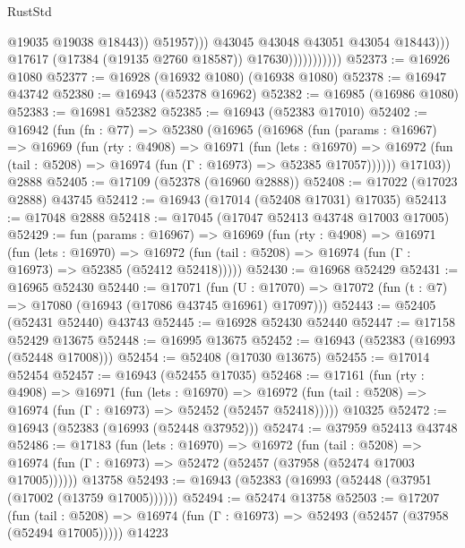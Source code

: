 \begin{lexlean}{RustStd}
\begin{coremodule}
                                          @19035
                                          @19038
                                          @18443))
                                      @51957)))
                                @43045
                                @43048
                                @43051
                                @43054
                                @18443)))
                          @17617
                          (@17384 (@19135 @2760 @18587))
                          @17630)))))))))))
@52373 := @16926 @1080
@52377 := @16928 (@16932 @1080) (@16938 @1080)
@52378 := @16947 @43742
@52380 := @16943 (@52378 @16962)
@52382 := @16985 (@16986 @1080)
@52383 := @16981 @52382
@52385 := @16943 (@52383 @17010)
@52402 := @16942
    (fun (fn : @77) =>
    @52380
      (@16965
        (@16968
          (fun (params : @16967) =>
          @16969
            (fun (rty : @4908) =>
            @16971
              (fun (lets : @16970) =>
              @16972 (fun (tail : @5208) => @16974 (fun (Γ : @16973) => @52385 @17057))))))
        @17103))
    @2888
@52405 := @17109 (@52378 (@16960 @2888))
@52408 := @17022 (@17023 @2888) @43745
@52412 := @16943 (@17014 (@52408 @17031) @17035)
@52413 := @17048 @2888
@52418 := @17045 (@17047 @52413 @43748 @17003 @17005)
@52429 := fun (params : @16967) =>
  @16969
    (fun (rty : @4908) =>
    @16971
      (fun (lets : @16970) =>
      @16972 (fun (tail : @5208) => @16974 (fun (Γ : @16973) => @52385 (@52412 @52418)))))
@52430 := @16968 @52429
@52431 := @16965 @52430
@52440 := @17071
    (fun (U : @17070) => @17072 (fun (t : @7) => @17080 (@16943 (@17086 @43745 @16961) @17097)))
@52443 := @52405 (@52431 @52440) @43743
@52445 := @16928 @52430 @52440
@52447 := @17158 @52429 @13675
@52448 := @16995 @13675
@52452 := @16943 (@52383 (@16993 (@52448 @17008)))
@52454 := @52408 (@17030 @13675)
@52455 := @17014 @52454
@52457 := @16943 (@52455 @17035)
@52468 := @17161
    (fun (rty : @4908) =>
    @16971
      (fun (lets : @16970) =>
      @16972 (fun (tail : @5208) => @16974 (fun (Γ : @16973) => @52452 (@52457 @52418)))))
    @10325
@52472 := @16943 (@52383 (@16993 (@52448 @37952)))
@52474 := @37959 @52413 @43748
@52486 := @17183
    (fun (lets : @16970) =>
    @16972
      (fun (tail : @5208) =>
      @16974 (fun (Γ : @16973) => @52472 (@52457 (@37958 (@52474 @17003 @17005))))))
    @13758
@52493 := @16943 (@52383 (@16993 (@52448 (@37951 (@17002 (@13759 @17005))))))
@52494 := @52474 @13758
@52503 := @17207
    (fun (tail : @5208) => @16974 (fun (Γ : @16973) => @52493 (@52457 (@37958 (@52494 @17005)))))
    @14223

\end{coremodule}
\end{lexlean}
